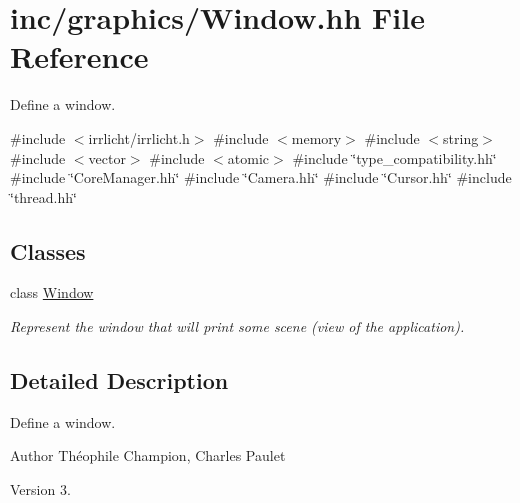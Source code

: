 \hypertarget{Window_8hh}{}\section{inc/graphics/\+Window.hh File Reference}
\label{Window_8hh}


Define a window.  


{\ttfamily \#include $<$irrlicht/irrlicht.\+h$>$}\newline
{\ttfamily \#include $<$memory$>$}\newline
{\ttfamily \#include $<$string$>$}\newline
{\ttfamily \#include $<$vector$>$}\newline
{\ttfamily \#include $<$atomic$>$}\newline
{\ttfamily \#include \char`\"{}type\+\_\+compatibility.\+hh\char`\"{}}\newline
{\ttfamily \#include \char`\"{}Core\+Manager.\+hh\char`\"{}}\newline
{\ttfamily \#include \char`\"{}Camera.\+hh\char`\"{}}\newline
{\ttfamily \#include \char`\"{}Cursor.\+hh\char`\"{}}\newline
{\ttfamily \#include \char`\"{}thread.\+hh\char`\"{}}\newline
\subsection*{Classes}
\begin{DoxyCompactItemize}
\item 
class \hyperlink{classWindow}{Window}
\begin{DoxyCompactList}\small\item\em Represent the window that will print some scene (view of the application). \end{DoxyCompactList}\end{DoxyCompactItemize}


\subsection{Detailed Description}
Define a window. 

\begin{DoxyAuthor}{Author}
Théophile Champion, Charles Paulet 
\end{DoxyAuthor}
\begin{DoxyVersion}{Version}
3. 
\end{DoxyVersion}
